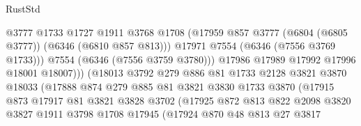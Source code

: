 \begin{lexlean}{RustStd}
\begin{coremodule}
                                    @3777
                                    @1733
                                    @1727
                                    @1911
                                    @3768
                                    @1708
                                    (@17959
                                      @857
                                      @3777
                                      (@6804 (@6805 @3777))
                                      (@6346 (@6810 @857 @813)))
                                    @17971
                                    @7554
                                    (@6346 (@7556 @3769 @1733)))
                                  @7554
                                  (@6346 (@7556 @3759 @3780)))
                                @17986
                                @17989
                                @17992
                                @17996
                                @18001
                                @18007)))
                          (@18013
                            @3792
                            @279
                            @886
                            @81
                            @1733
                            @2128
                            @3821
                            @3870
                            @18033
                            (@17888
                              @874
                              @279
                              @885
                              @81
                              @3821
                              @3830
                              @1733
                              @3870
                              (@17915
                                @873
                                @17917
                                @81
                                @3821
                                @3828
                                @3702
                                (@17925
                                  @872
                                  @813
                                  @822
                                  @2098
                                  @3820
                                  @3827
                                  @1911
                                  @3798
                                  @1708
                                  @17945
                                  (@17924
                                    @870
                                    @48
                                    @813
                                    @27
                                    @3817

\end{coremodule}
\end{lexlean}
